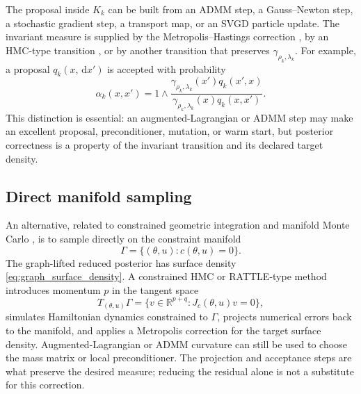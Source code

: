 \documentclass[11pt]{article}
\newcommand{\R}{\mathbb{R}}
\newcommand{\dd}{\,\mathrm{d}}
\begin{document}
The proposal inside \(K_k\) can be built from an ADMM step, a Gauss--Newton step, a stochastic gradient step, a transport map, or an SVGD particle update. The invariant measure is supplied by the Metropolis--Hastings correction \cite{MetropolisRosenbluthTellerTeller1953,Hastings1970}, by an HMC-type transition \cite{GirolamiCalderhead2011,DuaneKennedyPendletonRoweth1987,Neal2011}, or by another transition that preserves \(\gamma_{\rho_k,\lambda_k}\). For example, a proposal \(q_k(x,\dd x')\) is accepted with probability
\begin{equation}
 \alpha_k(x,x')
 =
 1\wedge
 \frac{\gamma_{\rho_k,\lambda_k}(x')q_k(x',x)}
    {\gamma_{\rho_k,\lambda_k}(x)q_k(x,x')}.
 \label{eq:mh_acceptance}
\end{equation}
This distinction is essential: an augmented-Lagrangian or ADMM step may make an excellent proposal, preconditioner, mutation, or warm start, but posterior correctness is a property of the invariant transition and its declared target density.

\subsection{Direct manifold sampling}

An alternative, related to constrained geometric integration and manifold Monte
Carlo
\cite{ByrneGirolami2013,ZappaHolmesCerfonGoodman2018,GrahamThieryBeskos2022,RyckaertCiccottiBerendsen1977,Andersen1983,HairerLubichWanner2006},
is to sample directly on the constraint manifold
\begin{equation}
 \Gamma=\{(\theta,u):c(\theta,u)=0\}.
\end{equation}
The graph-lifted reduced posterior has surface density
\eqref{eq:graph_surface_density}. A constrained HMC or RATTLE-type method
introduces momentum \(p\) in the tangent space
\begin{equation}
 T_{(\theta,u)}\Gamma
 =
 \{v\in\R^{p+q}:J_c(\theta,u)v=0\},
\end{equation}
simulates Hamiltonian dynamics constrained to \(\Gamma\), projects numerical errors back to the manifold, and applies a Metropolis correction for the target surface density. Augmented-Lagrangian or ADMM curvature can still be used to choose the mass matrix or local preconditioner. The projection and acceptance steps are what preserve the desired measure; reducing the residual alone is not a substitute for this correction.
\end{document}
